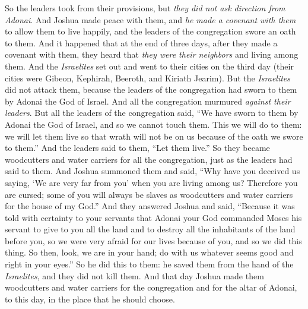 \begin{biblechapter}
\verse So the leaders took from their provisions, but \textit{they did not ask direction from Adonai}.
\verse And Joshua made peace with them, and \textit{he made a covenant with them} to allow them to live happily, and the leaders of the congregation swore an oath to them.
\verse And it happened that at the end of three days, after they made a covenant with them, they heard that \textit{they were their neighbors} and living among them.
\verse And the \textit{Israelites} set out and went to their cities on the third day (their cities were Gibeon, Kephirah, Beeroth, and Kiriath Jearim).
\verse But the \textit{Israelites} did not attack them, because the leaders of the congregation had sworn to them by Adonai the God of Israel. And all the congregation murmured \textit{against their leaders}.
\verse But all the leaders of the congregation said, “We have sworn to them by Adonai the God of Israel, and so we cannot touch them.
\verse This we will do to them: we will let them live so that wrath will not be on us because of the oath we swore to them.”
\verse And the leaders said to them, “Let them live.” So they became woodcutters and water carriers for all the congregation, just as the leaders had said to them.
\verse And Joshua summoned them and said, “Why have you deceived us saying, ‘We are very far from you’ when you are living among us?
\verse Therefore you are cursed; some of you will always be slaves as woodcutters and water carriers for the house of my God.”
\verse And they answered Joshua and said, “Because it was told with certainty to your servants that Adonai your God commanded Moses his servant to give to you all the land and to destroy all the inhabitants of the land before you, so we were very afraid for our lives because of you, and so we did this thing.
\verse So then, look, we are in your hand; do with us whatever seems good and right in your eyes.”
\verse So he did this to them: he saved them from the hand of the \textit{Israelites}, and they did not kill them.
\verse And that day Joshua made them woodcutters and water carriers for the congregation and for the altar of Adonai, to this day, in the place that he should choose.
\end{biblechapter}

